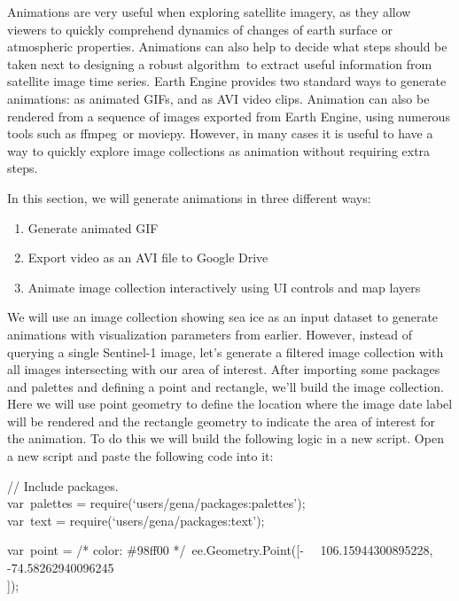 \documentclass[
  letterpaper,
  DIV=11,
  numbers=noendperiod]{scrreprt}
\providecommand{\tightlist}{%
  \setlength{\itemsep}{0pt}\setlength{\parskip}{0pt}}\usepackage{longtable,booktabs,array}
\begin{document}
Animations are very useful when exploring satellite imagery, as they
allow viewers to quickly comprehend dynamics of changes of earth surface
or atmospheric properties. Animations can also help to decide what steps
should be taken next to designing a robust algorithm~to extract useful
information from satellite image time series. Earth Engine provides two
standard ways to generate animations: as animated GIFs, and as AVI video
clips. Animation can also be rendered from a sequence of images exported
from Earth Engine, using numerous tools such as ffmpeg~or moviepy.
However, in many cases it is useful to have a way to quickly explore
image collections as animation without requiring extra steps.

In this section, we will generate animations in three different ways:

\begin{enumerate}
\def\labelenumi{\arabic{enumi}.}
\tightlist
\item
  Generate animated GIF
\item
  Export video as an AVI file to Google Drive
\item
  Animate image collection interactively using UI controls and map
  layers
\end{enumerate}

We will use an image collection showing sea ice as an input dataset to
generate animations with visualization parameters from earlier. However,
instead of querying a single Sentinel-1 image, let's generate a filtered
image collection with all images intersecting with our area of interest.
After importing some packages and palettes and defining a point and
rectangle, we'll build the image collection. Here we will use point
geometry to define the location where the image date label will be
rendered and the rectangle geometry to indicate the area of interest for
the animation. To do this we will build the following logic in a new
script. Open a new script and paste the following code into it:

// Include packages.\\
var~palettes = require(`users/gena/packages:palettes');\\
var~text = require(`users/gena/packages:text');

var~point = /* color: \#98ff00 */~ee.Geometry.Point({[}-~
~106.15944300895228, -74.58262940096245\\
{]});
\end{document}
